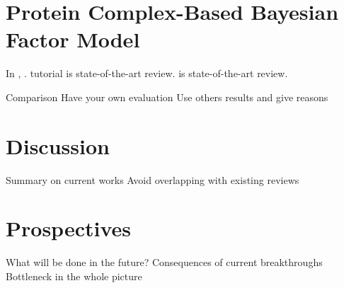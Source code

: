 \documentclass[12pt,conference,compsocconf]{../IEEEtran}
\begin{document}
\section{Protein Complex-Based Bayesian Factor Model}

In \citeyear{1079},  \citep{1079}.
\citep{1080}
\citep{1103} tutorial
\citep{1081} is state-of-the-art review.
\citep{1082} is state-of-the-art review.

Comparison
Have your own evaluation
Use others results and give reasons

\section{Discussion}

Summary on current works
  Avoid overlapping with existing reviews

\section{Prospectives}

What will be done in the future?
  Consequences of current breakthroughs
  Bottleneck in the whole picture



\end{document}
